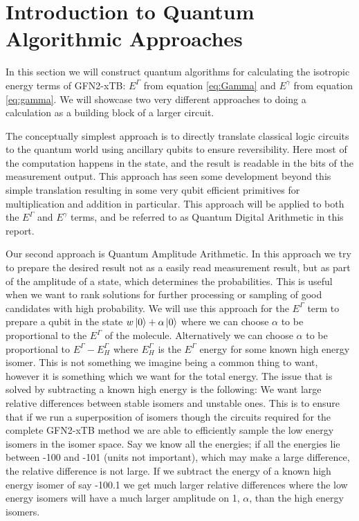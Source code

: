 \chapter{Introduction to Quantum Algorithmic Approaches}\label{sec:quant}
In this section we will construct quantum algorithms for calculating the isotropic energy terms of GFN2-xTB\cite{bannwarth2019}: $E^\Gamma$ from equation \ref{eq:Gamma} and $E^\gamma$ from equation \ref{eq:gamma}.
We will showcase two very different approaches to doing a calculation as a building block of a larger circuit.


The conceptually simplest approach is to directly translate classical logic circuits to the quantum world using ancillary qubits to ensure reversibility.
Here most of the computation happens in the state, and the result is readable in the bits of the measurement output.
This approach has seen some development beyond this simple translation resulting in some very qubit efficient primitives for multiplication and addition in particular\cite{draper2000,perez2017}.
This approach will be applied to both the $E^\Gamma$ and $E^\gamma$ terms, and be referred to as Quantum Digital Arithmetic in this report. 


Our second approach is Quantum Amplitude Arithmetic\cite{wang2020}. 
In this approach we try to prepare the desired result not as a easily read measurement result, but as part of the amplitude of a state, which determines the probabilities. This is useful when we want to rank solutions for further processing or sampling of good candidates with high probability.
We will use this approach for the $E^\Gamma$ term to prepare a qubit in the state $w\ket{0}+\alpha\ket{0}$ where we can choose $\alpha$ to be proportional to the $E^\Gamma$ of the molecule.
Alternatively we can choose $\alpha$ to be proportional to $E^\Gamma-E^\Gamma_H$ where $E^\Gamma_H$ is the $E^\Gamma$ energy for some known high energy isomer.
This is not something we imagine being a common thing to want, however it is something which we want for the total energy. 
The issue that is solved by subtracting a known high energy is the following:
We want large relative differences between stable isomers and unstable ones. 
This is to ensure that if we run a superposition of isomers though the circuits required for the complete GFN2-xTB method we are able to efficiently sample the low energy isomers in the isomer space.
Say we know all the energies; if all the energies lie between -100 and -101 (units not important), which may make a large difference, the relative difference is not large.
If we subtract the energy of a known high energy isomer of say -100.1 we get much larger relative differences where the low energy isomers will have a much larger amplitude on 1, $\alpha$, than the high energy isomers. 



